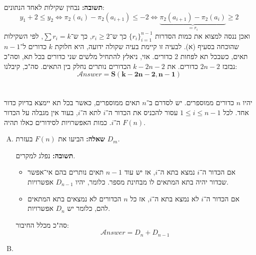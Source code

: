 \documentclass[]{article}
\newcommand\ans   {\mathscr{A}\!\mathit{nswer}}
\begin{document}
\begin{enumerate}[(A)]
		\textbf{תשובה: }נבחין שקילות לאחד הנתונים: 
		\[ y_1 + 2 \le y_2 \iff \pi_2(a_i) - \pi_2(a_{i + 1}) \le -2 \iff \underbrace{\pi_2(a_{i + 1}) - \pi_2(a_i)}_{=r_i} \ge 2 \]
		ואכן ננסה למצוא את כמות הסדרות $\{r_i\}_{i = 1}^{n - 1}$ כך ש־$r_i \ge 2$, כך ש־$\sum r_i = k$, לפי השקילות שהוכחה בסעיף (א). לבעיה זו קיימת בעיה שקולה ידועה, היא חלוקת $k$ כדורים ל־$n - 1$ תאים, כשבכל תא לפחות 2 כדורים. אזי, ניאלץ להתחיל מלשים שני כדורים בכל תא, וסה"כ נבזבז $2n - 2$ כדורים. את $k - 2n - 2$ הכדורים נותרים נחלק בין התאים. סה"כ, קיבלנו: 
		\[ \ans = \bm{S(k - 2n - 2, n - 1)} \]
	\end{enumerate}
	\section{}
	יהיו $n$ כדורים ממוספרים.  יש לסדרם ב־$n$ תאים ממוספרים, כאשר בכל תא יימצא בדיוק כדור אחד. לכל $1 \le i \le n - 1$ עסור להכניס את הכדור ה־$i$ לתא ה־$i$, בעוד אין מגבלה על הכדור ה־$i$. כמות האפשרויות לסידורים כאלו תהיה $F(n)$. 
	\begin{enumerate}[(A)]
		\item \textbf{שאלה: }הביעו את $F(n)$ בעזרת $D_m$. 
		
		\textbf{תשובה: }נפלג למקרים. 
		\begin{itemize}
			\item אם הכדור ה־$i$ נמצא בתא ה־$i$, אז יש עוד $n - 1$ תאים נותרים בהם אי־אפשר שכדור יהיה בתא המתאים לו מבחינת מספר. כלומר, יהיו $D_{n - 1}$ אפשרויות. 
			\item אם הכדור ה־$i$ לא נמצא בתא ה־$i$, אז כל $n$ הכדורים לא נמצאים בתא המתאים להם, כלומר יש $D_n$ אפשרויות. 
		\end{itemize}
		סה"כ מכלל החיבור: 
		\[ \ans = D_n + D_{n - 1} \]
		
		\item 
	\end{enumerate}
\end{document}
